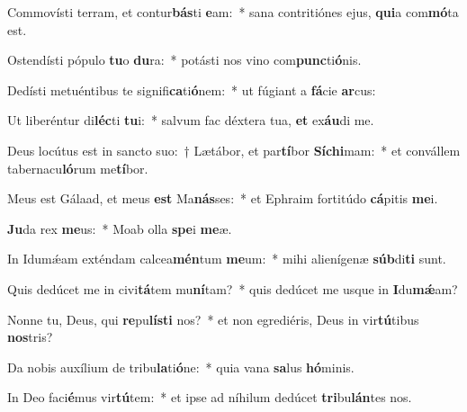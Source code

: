 \item Commovísti terram, et contur\textbf{bás}ti \textbf{e}am:~* sana contritiónes ejus, \textbf{qui}a com\textbf{mó}ta est.
\item Ostendísti pópulo \textbf{tu}o \textbf{du}ra:~* potásti nos vino com\textbf{punc}ti\textbf{ó}nis.
\item Dedísti metuéntibus te signifi\textbf{ca}ti\textbf{ó}nem:~* ut fúgiant a \textbf{fá}cie \textbf{ar}cus:
\item Ut liberéntur di\textbf{léc}ti \textbf{tu}i:~* salvum fac déxtera tua, \textbf{et} ex\textbf{áu}di me.
\item Deus locútus est in sancto suo:~† Lætábor, et par\textbf{tí}bor \textbf{Sí}\textbf{chi}mam:~* et convállem tabernacu\textbf{ló}rum me\textbf{tí}bor.
\item Meus est Gálaad, et meus \textbf{est} Ma\textbf{nás}ses:~* et Ephraim fortitúdo \textbf{cá}pitis \textbf{me}i.
\item \textbf{Ju}da rex \textbf{me}us:~* Moab olla \textbf{spe}i \textbf{me}æ.
\item In Idumǽam exténdam calcea\textbf{mén}tum \textbf{me}um:~* mihi alienígenæ \textbf{súb}di\textbf{ti} sunt.
\item Quis dedúcet me in civi\textbf{tá}tem mu\textbf{ní}tam?~* quis dedúcet me usque in \textbf{I}du\textbf{mǽ}am?
\item Nonne tu, Deus, qui \textbf{re}pu\textbf{lís}\textbf{ti} nos?~* et non egrediéris, Deus in vir\textbf{tú}tibus \textbf{nos}tris?
\item Da nobis auxílium de tribu\textbf{la}ti\textbf{ó}ne:~* quia vana \textbf{sa}lus \textbf{hó}minis.
\item In Deo faci\textbf{é}mus vir\textbf{tú}tem:~* et ipse ad níhilum dedúcet \textbf{tri}bu\textbf{lán}tes nos.
